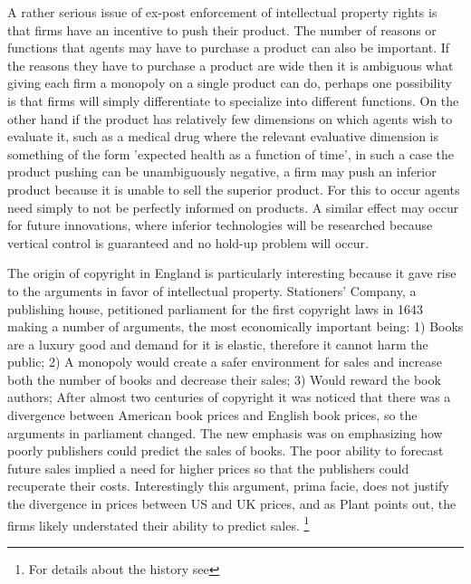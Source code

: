 \documentclass[12pt]{article}
\numberwithin{equation}{section}
\begin{document}
A rather serious issue of ex-post enforcement of intellectual property rights is that firms have an incentive to push their product. The number of reasons or functions that agents may have to purchase a product can also be important. If the reasons they have to purchase a product are wide then it is ambiguous what giving each firm a monopoly on a single product can do, perhaps one possibility is that firms will simply differentiate to specialize into different functions. On the other hand if the product has relatively few dimensions on which agents wish to evaluate it, such as a medical drug where the relevant evaluative dimension is something of the form 'expected health as a function of time', in such a case the product pushing can be unambiguously negative, a firm may push an inferior product because it is unable to sell the superior product. For this to occur agents need simply to not be perfectly informed on products. A similar effect may occur for future innovations, where inferior technologies will be researched because vertical control is guaranteed and no hold-up problem will occur.


The origin of copyright in England is particularly interesting because it gave rise to the arguments in favor of intellectual property. Stationers' Company, a publishing house, petitioned parliament for the first copyright laws in 1643 making a number of arguments, the most economically important being: 1) Books are a luxury good and demand for it is elastic, therefore it cannot harm the public; 2) A monopoly would create a safer environment for sales and increase both the number of books and decrease their sales; 3) Would reward the book authors; After almost two centuries of copyright it was noticed that there was a divergence between American book prices and English book prices, so the arguments in parliament changed. The new emphasis was on emphasizing how poorly publishers could predict the sales of books. The poor ability to forecast future sales implied a need for higher prices so that the publishers could recuperate their costs. Interestingly this argument, prima facie, does  not justify the divergence in prices between US and UK prices, and as Plant points out, the firms likely understated their ability to predict sales. \footnote{For details about the history see\cite{Plant1934}}

\end{document}
